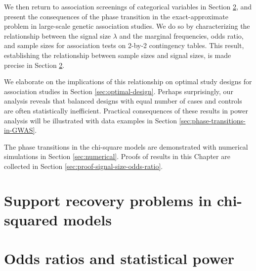 We then return to association screenings of categorical variables in
Section \ref{sec:odds-and-power}, and present the consequences of the phase transition in the exact-approximate problem in large-scale genetic association studies.
We do so by characterizing the relationship between the signal size $\lambda$ and the marginal frequencies, odds ratio, and sample sizes for association tests on 2-by-2 contingency tables.
This result, establishing the relationship between sample sizes and signal sizes, is made precise in Section \ref{sec:odds-and-power}.

We elaborate on the implications of this relationship on optimal study designs for association studies in Section \ref{sec:optimal-design}.
Perhaps surprisingly, our analysis reveals that balanced designs with equal number of cases and controls are often statistically inefficient.
Practical consequences of these results in power analysis will be illustrated with data examples in Section \ref{sec:phase-transitions-in-GWAS}. 

The phase transitions in the chi-square models are demonstrated with numerical simulations in Section \ref{sec:numerical}.
Proofs of results in this Chapter are collected in Section \ref{sec:proof-signal-size-odds-ratio}.


\section{Support recovery problems in chi-squared models}
\label{sec:chisq-boundaries}



\section{Odds ratios and statistical power}
\label{sec:odds-and-power}



